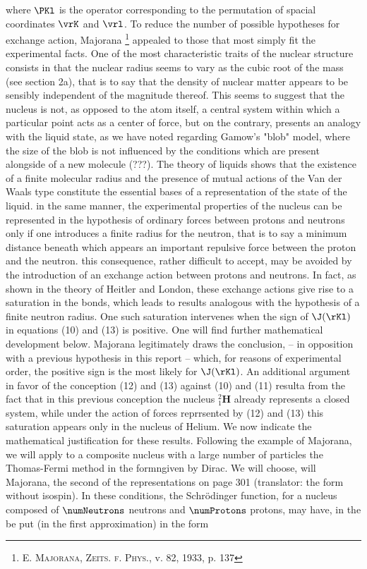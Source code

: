 \documentclass{article}
\newcommand{\element}[1]{\textbf{#1}}
\newcommand{\isotope}[3]{
{{}^{#3}_{#2}\element{#1}}
}
\begin{document}
where $\PKl$ is the operator corresponding to the permutation of spacial coordinates $\vrK$ and $\vrl$.
To reduce the number of possible hypotheses for exchange action, Majorana \footnote{\textsc{E. Majorana}, \textsc{Zeits. f. Phys.}, v. 82, 1933, p. 137} appealed to those that most simply fit the experimental facts. One of the most characteristic traits of the nuclear structure consists in that the nuclear radius seems to vary as the cubic root of the mass (see section 2a), that is to say that the density of nuclear matter appears to be sensibly independent of the magnitude thereof. This seems to suggest that the nucleus is not, as opposed to the atom itself, a central system within which a particular point acts as a center of force, but on the contrary, presents an analogy with the liquid state, as we have noted regarding Gamow's "blob" model, where the size of the blob is not influenced by the conditions which are present alongside of a new molecule (???). The theory of liquids shows that the existence of a finite molecular radius and the presence of mutual actions of the Van der Waals type constitute the essential bases of a representation of the state of the liquid. in the same manner, the experimental properties of the nucleus can be represented in the hypothesis of ordinary forces between protons and neutrons only if one introduces a finite radius for the neutron, that is to say a minimum distance beneath which appears an important repulsive force between the proton and the neutron. this consequence, rather difficult to accept, may be avoided by the introduction of an exchange action between protons and neutrons. In fact, as shown in the theory of Heitler and London, these exchange actions give rise to a saturation in the bonds, which leads to results analogous with the hypothesis of a finite neutron radius. One such saturation intervenes when the sign of $\J(\rKl)$ in equations (10) and (13) is positive. One will find further mathematical development below.
Majorana legitimately draws the conclusion, -- in opposition with a previous hypothesis in this report -- which, for reasons of experimental order, the positive sign is the most likely for $\J(\rKl)$. An additional argument in favor of the conception (12) and (13) against (10) and (11) resulta from the fact that in this previous conception the nucleus $\isotope{H}{1}{2}$ already represents a closed system, while under the action of forces reprrsented by (12) and (13) this saturation appears only in the nucleus of Helium.
We now indicate the mathematical justification for these results. Following the example of Majorana, we will apply to a composite nucleus with a large number of particles the Thomas-Fermi method in the formngiven by Dirac. We will choose, will Majorana, the second of the representations on page 301 (translator: the form without isospin). In these conditions, the Schrödinger function, for a nucleus composed of $\numNeutrons$ neutrons and $\numProtons$ protons, may have, in the be put (in the first approximation) in the form
\end{document}
